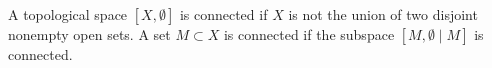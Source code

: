 A topological space $[X, \emptyset]$ is connected if $X$ is not the union of two disjoint nonempty open sets. A set $M \subset X$ is connected if the subspace $[M, \emptyset \mid M]$ is connected.
